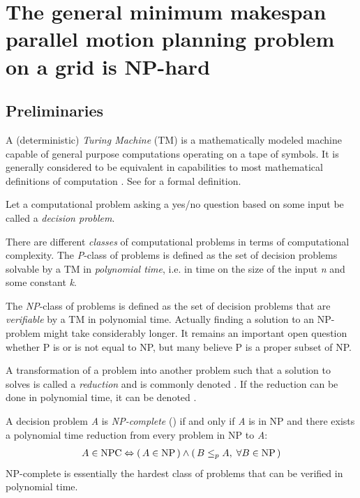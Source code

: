 \section{The general minimum makespan parallel motion planning problem on a grid is NP-hard}

\cite{siamcomp/DemaineFKMS19} \cite{corr/YuL15c}

\subsection{Preliminaries}

A (deterministic) \emph{Turing Machine} (TM) is a mathematically modeled machine capable of general purpose computations operating on a tape of symbols. It is generally considered to be equivalent in capabilities to most mathematical definitions of computation \cite{aw/HopcroftU79}. See \cite{aw/HopcroftU79} for a formal definition.

Let a computational problem asking a yes/no question based on some input be called a \emph{decision problem}.

There are different \emph{classes} of computational problems in terms of computational complexity. The \emph{P}-class of problems is defined as the set of decision problems solvable by a TM in \emph{polynomial time}, i.e. in  time on the size of the input \emph{n} and some constant \emph{k}.

The \emph{NP}-class of problems is defined as the set of decision problems that are \emph{verifiable} by a TM in polynomial time. Actually finding a solution to an NP-problem might take considerably longer. It remains an important open question whether P is or is not equal to NP, but many believe P is a proper subset of NP.

A transformation of a problem  into another problem  such that a solution to  solves  is called a \emph{reduction} and is commonly denoted . If the reduction can be done in polynomial time, it can be denoted .

\begin{definition}\label{def:np_complete}
	A decision problem \emph{A} is \emph{NP-complete} () if and only if \emph{A} is in NP and there exists a polynomial time reduction from every problem in NP to \emph{A}:
	\begin{align*}
		A \in \text{NPC} \Leftrightarrow (\, A \in \text{NP} \,) \land (\, B \leq_p A, \; \forall B \in \text{NP} \,)
	\end{align*}
	NP-complete is essentially the hardest class of problems that can be verified in polynomial time. 
\end{definition}

